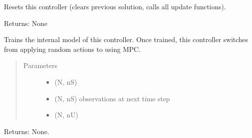 \documentclass[letterpaper,10pt,english,openany,oneside]{sphinxmanual}
\begin{document}
\begin{fulllineitems}
\begin{fulllineitems}
\label{\detokenize{_modules/controllers:controllers.MPC.MPC.optimizers}}
\end{fulllineitems}


\begin{fulllineitems}
\label{\detokenize{_modules/controllers:controllers.MPC.MPC.reset}}
Resets this controller (clears previous solution, calls all update functions).

Returns: None

\end{fulllineitems}


\begin{fulllineitems}
\label{\detokenize{_modules/controllers:controllers.MPC.MPC.train}}
Trains the internal model of this controller. Once trained,
this controller switches from applying random actions to using MPC.
\begin{quote}\begin{description}
\item[{Parameters}] \leavevmode\begin{itemize}
\item {} 
 \textendash{} (N, nS)

\item {} 
 \textendash{} (N, nS) observations at next time step

\item {} 
 \textendash{} (N, nU)

\end{itemize}

\end{description}\end{quote}

Returns: None.

\end{fulllineitems}


\end{fulllineitems}
\end{document}
